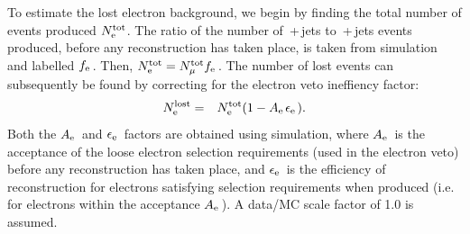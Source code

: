 To estimate the lost electron background, we begin by finding the total number of \wenu events produced $N^{\rm tot}_{\mathrm{e}\,}$.
The ratio of the number of \wmunubr\,+\,jets to \wenubr\,+\,jets events produced, before any reconstruction has taken place, is taken from simulation and labelled $f_{\mathrm{e}\,}$.  
Then, $N^{\rm tot}_{\mathrm{e}\,} = N^{\rm tot}_{\mu}  f_{\mathrm{e}\,}$. 
The number of lost \wenu events can subsequently be found by correcting for the electron veto ineffiency factor:
\begin{eqnarray}
N^{\rm lost}_{\mathrm{e}\,} &=& N^{\rm tot}_{\mathrm{e}\,}(1 - A_{\mathrm{e}\,}\epsilon_{\mathrm{e}\,}).
\end{eqnarray}
Both the $A_{\mathrm{e}\,}$ and $\epsilon_{\mathrm{e}\,}$ factors are obtained using simulation, where $A_{\mathrm{e}\,}$ is the acceptance of the loose electron selection requirements (used in the electron veto) before any reconstruction has taken place, 
and $\epsilon_{\mathrm{e}\,}$ is the efficiency of reconstruction for electrons satisfying selection requirements when produced (i.e. for electrons within the acceptance $A_{\mathrm{e}\,}$).
A data/MC scale factor of 1.0 is assumed. %

